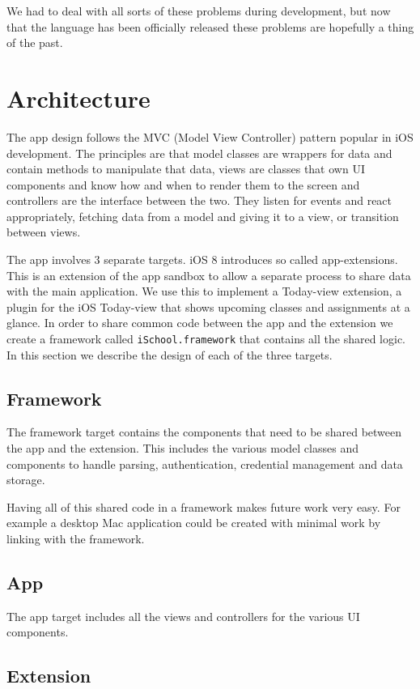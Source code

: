 \documentclass[pdftex, DIV=calc, paper=a4, fontsize=11pt, twocolumn]{scrartcl}	 %
\begin{document}
We had to deal with all sorts of these problems during development, but now that the language has 
been officially released these problems are hopefully a thing of the past.

\section*{Architecture}

The app design follows the MVC (Model View Controller) pattern popular in iOS development.
The principles are that model classes are wrappers for data and contain methods to manipulate that
data, views are classes that own UI components and know how and when to render them to the screen
and controllers are the interface between the two. They listen for events and react appropriately, 
fetching data from a model and giving it to a view, or transition between views.

The app involves 3 separate targets. iOS 8 introduces so called app-extensions. This is an extension
of the app sandbox to allow a separate process to share data with the main application. We use
this to implement a Today-view extension, a plugin for the iOS Today-view that shows upcoming classes
and assignments at a glance. In order to share common code between the app and the extension we
create a framework called \texttt{iSchool.framework} that contains all the shared logic. In this 
section we describe the design of each of the three targets.

\subsection*{Framework}
The framework target contains the components that need to be shared between the app and the extension.
This includes the various model classes and components to handle parsing, authentication, credential
management and data storage.

Having all of this shared code in a framework makes future work very easy. For example a desktop Mac
application could be created with minimal work by linking with the framework.

\subsection*{App}

The app target includes all the views and controllers for the various UI components. 
\lipsum[12]

\subsection*{Extension}
\end{document}
